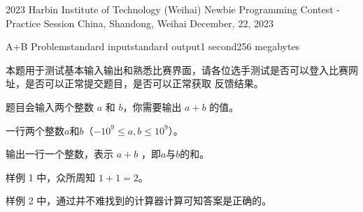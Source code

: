 \documentclass[12pt,a4paper,oneside]{article}
\begin{document}
\contest
{2023 Harbin Institute of Technology (Weihai) Newbie Programming Contest - Practice Session}%
{China, Shandong, Weihai}%
{December, 22, 2023}%


    \begin{problem}{A+B Problem}{standard input}{standard output}{1 second}{256 megabytes}
	
        本题用于测试基本输入输出和熟悉比赛界面，请各位选手测试是否可以登入比赛网址，是否可以正常提交题目，是否可以正常获取
反馈结果。

题目会输入两个整数 $a$ 和 $b$，你需要输出 $a + b$ 的值。
        
        
	\InputFile

        一行两个整数$a$和$b$（$-10^9 \le a,b \le 10^9$）。
        
        \OutputFile
	输出一行一个整数，表示 $a+b$ ，即$a$与$b$的和。
	\Example
	
	\begin{example}
	\end{example}

        \Note
        样例 1 中，众所周知 $1 + 1 = 2$。
        
        样例 2 中，通过并不难找到的计算器计算可知答案是正确的。
	
\end{problem}
\end{document}
